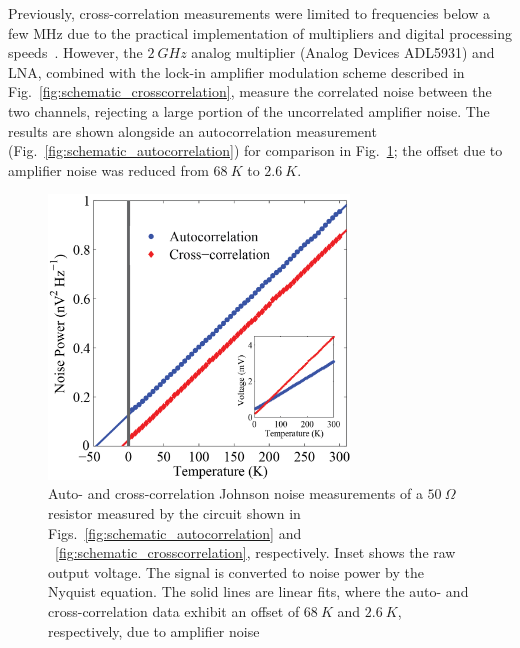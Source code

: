 Previously, cross-correlation measurements were limited to frequencies below a few MHz due to the practical implementation of multipliers and digital processing speeds~\cite{brophy_correlatoramplifier_1965, klein_measurement_1979, sampietro_high_2000, dicarlo_system_2006}. However, the $2~GHz$ analog multiplier (Analog Devices ADL5931) and LNA, combined with the lock-in amplifier modulation scheme described in Fig.~\ref{fig:schematic_crosscorrelation}, measure the correlated noise between the two channels, rejecting a large portion of the uncorrelated amplifier noise. The results are shown alongside an autocorrelation measurement (Fig.~\ref{fig:schematic_autocorrelation}) for comparison in Fig.~\ref{fig:cross_noise_vs_T}; the offset due to amplifier noise was reduced from $68~K$ to $2.6~K$.

\begin{figure}
\centering
\includegraphics[width = 80mm]{figures/Johnson_noise_thermometry/Cross_noise_vs_T.png}
\caption{Auto- and cross-correlation Johnson noise measurements of a $50~\Omega$ resistor measured by the circuit shown in Figs.~\ref{fig:schematic_autocorrelation} and ~\ref{fig:schematic_crosscorrelation}, respectively. Inset shows the raw output voltage. The signal is converted to noise power by the Nyquist equation. The solid lines are linear fits, where the auto- and cross-correlation data exhibit an offset of $68~K$ and $2.6~K$, respectively, due to amplifier noise}
\label{fig:cross_noise_vs_T}
\end{figure}
